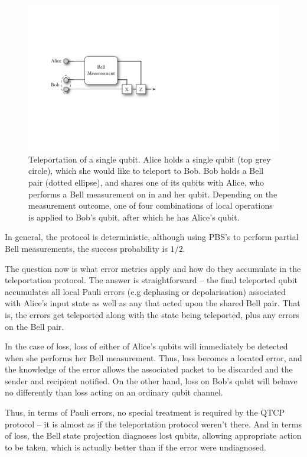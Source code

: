 \documentclass[aps,rmp,twocolumn,amsmath,amssymb,nofootinbib,superscriptaddress,longbibliography,floatfix]{revtex4-1}
\begin{document}
\begin{figure}[!htb]
\includegraphics[width=0.9\columnwidth]{teleportation}
\caption{Teleportation of a single qubit. Alice holds a single qubit (top grey circle), which she would like to teleport to Bob. Bob holds a Bell pair (dotted ellipse), and shares one of its qubits with Alice, who performs a Bell measurement on in and her qubit. Depending on the measurement outcome, one of four combinations of local operations is applied to Bob's qubit, after which he has Alice's qubit.} \label{fig:teleport}
\end{figure}

In general, the protocol is deterministic, although using PBS's to perform partial Bell measurements, the success probability is $1/2$.

The question now is what error metrics apply and how do they accumulate in the teleportation protocol. The answer is straightforward -- the final teleported qubit accumulates all local Pauli errors (e.g dephasing or depolarisation) associated with Alice's input state as well as any that acted upon the shared Bell pair. That is, the errors get teleported along with the state being teleported, plus any errors on the Bell pair.

In the case of loss, loss of either of Alice's qubits will immediately be detected when she performs her Bell measurement. Thus, loss becomes a located error, and the knowledge of the error allows the associated packet to be discarded and the sender and recipient notified. On the other hand, loss on Bob's qubit will behave no differently than loss acting on an ordinary qubit channel.

Thus, in terms of Pauli errors, no special treatment is required by the QTCP protocol -- it is almost as if the teleportation protocol weren't there. And in terms of loss, the Bell state projection diagnoses lost qubits, allowing appropriate action to be taken, which is actually better than if the error were undiagnosed.
\end{document}
